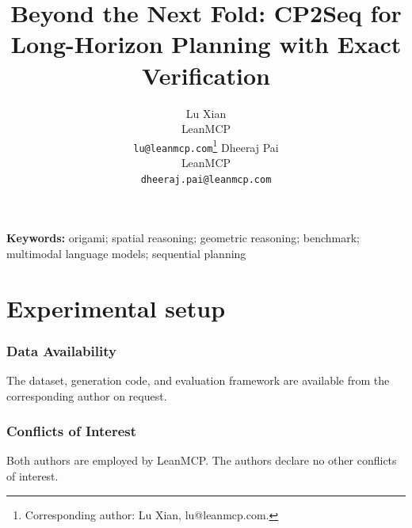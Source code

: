 \documentclass{article} %
\title{Beyond the Next Fold: CP2Seq for Long-Horizon Planning with Exact Verification}
\author{Lu Xian \\
LeanMCP \\
\texttt{lu@leanmcp.com}\thanks{Corresponding author: Lu Xian, lu@leanmcp.com.}
\And
Dheeraj Pai \\
LeanMCP \\
\texttt{dheeraj.pai@leanmcp.com}}
\newif\ifdraftnotes
\begin{document}
\maketitle
{}




\noindent\textbf{Keywords:} origami; spatial reasoning; geometric reasoning; benchmark; multimodal language models; sequential planning




\section{Experimental setup}
\label{sec:experimental-setup}







\ifdraftnotes

\fi



\subsubsection*{Data Availability}

The dataset, generation code, and evaluation framework are available from the corresponding author on request.

\subsubsection*{Conflicts of Interest}

Both authors are employed by LeanMCP. The authors declare no other conflicts of interest.




\appendix





\ifdraftnotes

% 
\fi
\end{document}
